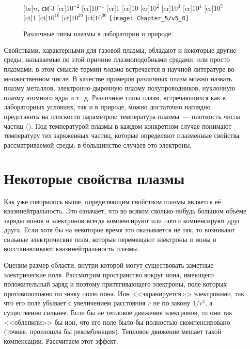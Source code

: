 \begin{figure}
	[br]{\footnotesize $n$, см\^{-3}}
	[cr]{\footnotesize $10^{-2}$}
	[cr]{\footnotesize $10^{-1}$}
	[cr]{\footnotesize $1$}
	[cr]{\footnotesize $10$}
	[cr]{\footnotesize $10^{2}$}
	[cr]{\footnotesize $10^{3}$}
	[cr]{\footnotesize $10^{4}$}
	[cr]{\footnotesize $10^{5}$}
	[ct]{\footnotesize $1$}
	[ct]{\footnotesize $10^{10}$}
	[ct]{\footnotesize $10^{20}$}
	[ct]{\footnotesize $10^{30}$}
	\texttt{[image: Chapter\_5/v5\_0]}
	\caption{Различные типы плазмы в лаборатории и природе}
\end{figure}


Свойствами, характерными для газовой плазмы, обладают и некоторые другие среды, называемые по этой причине
плазмоподобными средами, или просто плазмами: в этом смысле термин {\em плазма} встречается в научной литературе во
множественном числе. В качестве примеров различных плазм можно назвать плазму металлов, электронно-дырочную плазму
полупроводников, нуклонную плазму атомного ядра и т.~д. Различные типы плазм, встречающихся как в лабораторных условиях,
так и в природе, можно достаточно наглядно представить на плоскости параметров: температура плазмы~--- плотность числа
частиц (). Под температурой плазмы в каждом конкретном случае понимают температуру тех заряженных частиц, которые
определяют плазменные свойства рассматриваемой среды: в большинстве случаев это электроны.

\section{Некоторые свойства плазмы}

Как уже говорилось выше, определяющим свойством плазмы является её квазинейтральность. Это означает, что во всяком
сколько-нибудь большом объёме заряды ионов и электронов всегда компенсируют или почти компенсируют друг друга. Если хотя
бы на некоторое время это оказывается не так, то возникают сильные электрические поля, которые перемещают электроны и
ионы и восстанавливают квазинейтральность плазмы.

Оценим размер области, внутри которой могут существовать заметные электрические поля. Рассмотрим пространство вокруг
иона, имеющего положительный заряд и поэтому притягивающего электроны, поле которых противоположно по знаку полю иона.
Ион <<экранируется>> электронами, так что его поле убывает с увеличением расстояния $r$ не по закону $1/r^2$, а
существенно сильнее. Если бы не тепловое движение электронов, то они так <<облепили>> бы ион, что его поле было бы
полностью скомпенсировано (точнее, произошла бы рекомбинация). Тепловое движение мешает такой компенсации. Рассчитаем
этот эффект.

